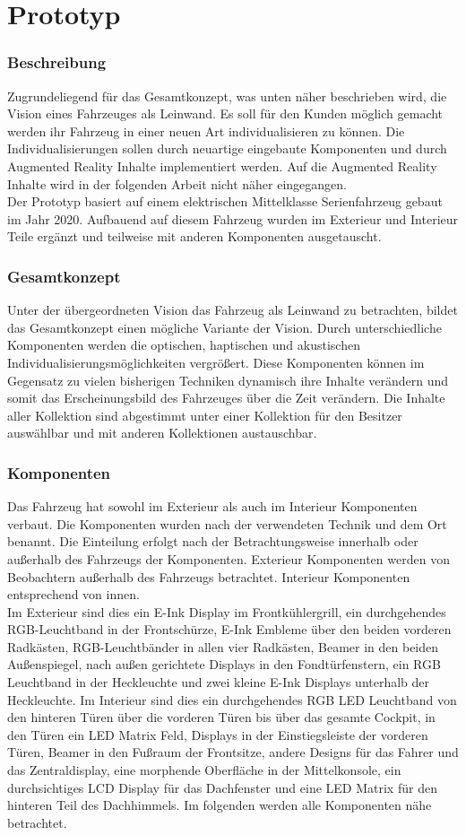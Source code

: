 \chapter{Prototyp}
\label{cha:Prototyp}
\subsection{Beschreibung}
Zugrundeliegend für das Gesamtkonzept, was unten näher beschrieben wird, die Vision eines Fahrzeuges als Leinwand. Es soll für den Kunden möglich gemacht werden ihr Fahrzeug in einer neuen Art individualisieren zu können. Die Individualisierungen sollen durch neuartige eingebaute Komponenten und durch Augmented Reality Inhalte implementiert werden. Auf die Augmented Reality Inhalte wird in der folgenden Arbeit nicht näher eingegangen.\\
Der Prototyp basiert auf einem elektrischen Mittelklasse Serienfahrzeug gebaut im Jahr 2020. Aufbauend auf diesem Fahrzeug wurden im Exterieur und Interieur Teile ergänzt und teilweise mit anderen Komponenten ausgetauscht.
\subsection{Gesamtkonzept}
Unter der übergeordneten Vision das Fahrzeug als Leinwand zu betrachten, bildet das Gesamtkonzept einen mögliche Variante der Vision. 
Durch unterschiedliche Komponenten werden die optischen, haptischen und akustischen Individualisierungsmöglichkeiten vergrößert. Diese Komponenten können im Gegensatz zu vielen bisherigen Techniken dynamisch ihre Inhalte verändern und somit das Erscheinungsbild des Fahrzeuges über die Zeit verändern. Die Inhalte aller Kollektion sind abgestimmt unter einer Kollektion für den Besitzer auswählbar und mit anderen Kollektionen austauschbar.
\subsection{Komponenten}
Das Fahrzeug hat sowohl im Exterieur als auch im Interieur Komponenten verbaut. Die Komponenten wurden nach der verwendeten Technik und dem Ort benannt. Die Einteilung erfolgt nach der Betrachtungsweise innerhalb oder außerhalb des Fahrzeugs der Komponenten. Exterieur Komponenten werden von Beobachtern außerhalb des Fahrzeugs betrachtet. Interieur Komponenten entsprechend von innen.\\
Im Exterieur sind dies ein E-Ink Display im Frontkühlergrill, ein durchgehendes RGB-Leuchtband in der Frontschürze, E-Ink Embleme über den beiden vorderen Radkästen, RGB-Leuchtbänder in allen vier Radkästen, Beamer in den beiden Außenspiegel, nach außen gerichtete Displays in den Fondtürfenstern, ein RGB Leuchtband in der Heckleuchte und zwei kleine E-Ink Displays unterhalb der Heckleuchte.
Im Interieur sind dies ein durchgehendes RGB LED Leuchtband von den hinteren Türen über die vorderen Türen bis über das gesamte Cockpit, in den Türen ein LED Matrix Feld, Displays in der Einstiegsleiste der vorderen Türen, Beamer in den Fußraum der Frontsitze, andere Designs für das Fahrer und das Zentraldisplay, eine morphende Oberfläche in der Mittelkonsole, ein durchsichtiges LCD Display für das Dachfenster und eine LED Matrix für den hinteren Teil des Dachhimmels.
Im folgenden werden alle Komponenten nähe betrachtet.
